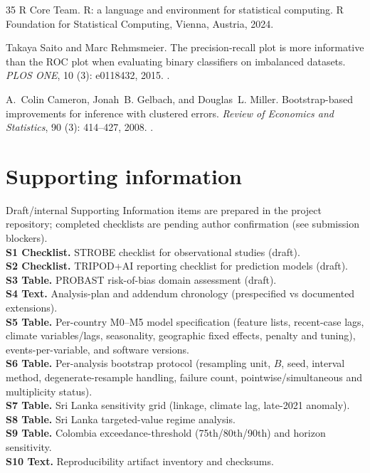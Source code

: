 \documentclass[11pt,a4paper]{article}
\begin{document}
\begin{thebibliography}{35}
{R Core Team}.
\newblock R: a language and environment for statistical computing.
\newblock R Foundation for Statistical Computing, Vienna, Austria, 2024.

Takaya Saito and Marc Rehmsmeier.
\newblock The precision-recall plot is more informative than the {ROC} plot
  when evaluating binary classifiers on imbalanced datasets.
\newblock \emph{PLOS ONE}, 10 (3): e0118432, 2015.
\newblock {}.

A.~Colin Cameron, Jonah~B. Gelbach, and Douglas~L. Miller.
\newblock Bootstrap-based improvements for inference with clustered errors.
\newblock \emph{Review of Economics and Statistics}, 90 (3):
  414--427, 2008.
\newblock {}.

\end{thebibliography}

\section*{Supporting information}
\noindent Draft/internal Supporting Information items are prepared in the project repository; completed checklists are pending author confirmation (see submission blockers).\\[0.3em]
\noindent\textbf{S1 Checklist.} STROBE checklist for observational studies (draft).\\
\textbf{S2 Checklist.} TRIPOD+AI reporting checklist for prediction models (draft).\\
\textbf{S3 Table.} PROBAST risk-of-bias domain assessment (draft).\\
\textbf{S4 Text.} Analysis-plan and addendum chronology (prespecified vs documented extensions).\\
\textbf{S5 Table.} Per-country M0--M5 model specification (feature lists, recent-case lags, climate variables/lags, seasonality, geographic fixed effects, penalty and tuning), events-per-variable, and software versions.\\
\textbf{S6 Table.} Per-analysis bootstrap protocol (resampling unit, $B$, seed, interval method, degenerate-resample handling, failure count, pointwise/simultaneous and multiplicity status).\\
\textbf{S7 Table.} Sri Lanka sensitivity grid (linkage, climate lag, late-2021 anomaly).\\
\textbf{S8 Table.} Sri Lanka targeted-value regime analysis.\\
\textbf{S9 Table.} Colombia exceedance-threshold (75th/80th/90th) and horizon sensitivity.\\
\textbf{S10 Text.} Reproducibility artifact inventory and checksums.
\end{document}
